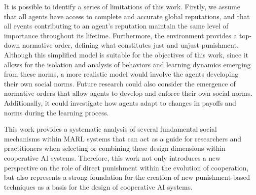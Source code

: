 \documentclass[sn-aps,numbered]{sn-jnl}%
\theoremstyle{thmstyleone}%
\theoremstyle{thmstyletwo}%
\theoremstyle{thmstylethree}%
\begin{document}
It is possible to identify a series of limitations of this work. Firstly, we assume that all agents have access to complete and accurate global reputations, and that all events contributing to an agent’s reputation maintain the same level of importance throughout its lifetime. Furthermore, the environment provides a top-down normative order, defining what constitutes just and unjust punishment. Although this simplified model is suitable for the objectives of this work, since it allows for the isolation and analysis of behaviors and learning dynamics emerging from these norms, a more realistic model would involve the agents developing their own social norms.
Future research could also consider the emergence of normative orders that allow agents to develop and enforce their own social norms. Additionally, it could investigate how agents adapt to changes in payoffs and norms during the learning process.

This work provides a systematic analysis of several fundamental social mechanisms within MARL systems that can act as a guide for researchers and practitioners when selecting or combining these design dimensions within cooperative AI systems. Therefore, this work not only introduces a new perspective on the role of direct punishment within the evolution of cooperation, but also represents a strong foundation for the creation of new punishment-based techniques as a basis for the design of cooperative AI systems.

\clearpage
\backmatter

\end{document}
